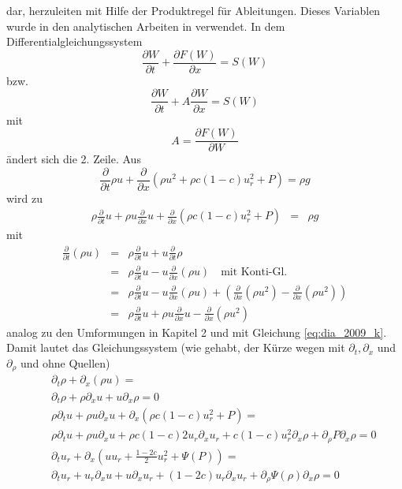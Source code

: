 dar, herzuleiten mit Hilfe der Produktregel für Ableitungen. Dieses
Variablen wurde in den analytischen Arbeiten in \cite{dia_2009}
verwendet. In dem Differentialgleichungssystem
\begin{equation}
\frac{\partial W}{\partial t} + \frac{\partial F(W)}{\partial x} =
S(W)
\end{equation}
bzw.
\[
\frac{\partial W}{\partial t} + A
\frac{\partial W}{\partial x} =
S(W)
\]
mit
\[
A = \frac{\partial F(W)}{\partial W} 
\]
ändert sich die 2. Zeile. Aus
\[
\frac{\partial}{\partial t} \rho u + \frac{\partial}{\partial x} (
\rho u^2 + \rho c (1-c) u_r^2 + P) = \rho g 
\]
wird zu
\begin{eqnarray*}
\rho \frac{\partial}{\partial t} u + \rho u \frac{\partial}{\partial x}
u + \frac{\partial}{\partial x} (\rho c (1-c) u_r^2 +
P)&=& \rho g
\end{eqnarray*}
mit
\begin{eqnarray*}
\frac{\partial}{\partial t} (\rho u) &=& \rho \frac{\partial}{\partial
  t} u + u \frac{\partial}{\partial t} \rho \\ 
&=& \rho\frac{\partial}{\partial t} u - u \frac{\partial}{\partial x} (\rho u)\quad\mbox{mit Konti-Gl.}\\
&=& \rho\frac{\partial}{\partial t} u - u \frac{\partial}{\partial x} (\rho u)
+\left( \frac{\partial}{\partial x} (\rho u^2) - \frac{\partial}{\partial x} (\rho u^2) \right)\\
&=& \rho \frac{\partial}{\partial t} u + \rho u
\frac{\partial}{\partial x} u - \frac{\partial}{\partial x} (\rho u^2)
\end{eqnarray*}
analog zu den Umformungen in Kapitel 2 und mit Gleichung
\ref{eq:dia_2009_k}. Damit lautet das Gleichungssystem (wie gehabt,
der Kürze wegen mit $\partial_t, \partial_x$ und $\partial_{\rho}$ und
ohne Quellen)
\begin{eqnarray}
&&  \partial_t \rho + \partial_x (\rho u) = \nonumber \\
&&  \partial_t \rho + \rho \partial_x u + u \partial_x \rho = 0 \label{eq:prim_rho}\\[2mm]
%
&& \rho \partial_t u + \rho u \partial_x u 
+ \partial_x (\rho c (1-c) u_r^2 + P) = \nonumber \\
&& \rho \partial_t u + \rho u \partial_x u 
   + \rho c (1-c) 2 u_r \partial_x u_r
   + c (1-c) u_r^2 \partial_x \rho 
   + \partial_{\rho} P \partial_x \rho = 0\label{eq:prim_u}\\[2mm]
% 
&& \partial_t u_r + \partial_x (uu_r + \frac{1-2c}{2} u_r^2 +
   \Psi(P)) = \nonumber \\
&& \partial_t u_r + u_r \partial_x u
                  + u \partial_x u_r
                  + (1-2c) u_r \partial_x u_r 
                  + \partial_{\rho} \Psi(\rho)\partial_x\rho = 0 \label{eq:prim_ur}\
\end{eqnarray}
